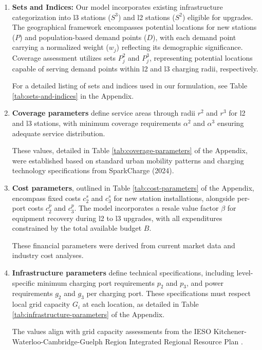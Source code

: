 \begin{enumerate}

    \item \textbf{Sets and Indices:} Our model incorporates existing infrastructure categorization into \gls{l3} stations ($S^3$) and \gls{l2} stations ($S^2$) eligible for upgrades. The geographical framework encompasses potential locations for new stations ($P$) and population-based demand points ($D$), with each demand point carrying a normalized weight ($w_j$) reflecting its demographic significance. Coverage assessment utilizes sets $P^2_j$ and $P^3_j$, representing potential locations capable of serving demand points within \gls{l2} and \gls{l3} charging radii, respectively. 
    
    For a detailed listing of sets and indices used in our formulation, see Table \ref{tab:sets-and-indices} in the Appendix.

    \item \textbf{Coverage parameters} define service areas through radii $r^2$ and $r^3$ for \gls{l2} and \gls{l3} stations, with minimum coverage requirements $\alpha^2$ and $\alpha^3$ ensuring adequate service distribution. 
    
    These values, detailed in Table \ref{tab:coverage-parameters} of the Appendix, were established based on standard urban mobility patterns and charging technology specifications from SparkCharge (2024). \cite{spark2024}

    \item \textbf{Cost parameters}, outlined in Table \ref{tab:cost-parameters} of the Appendix, encompass fixed costs $c_2^s$ and $c_3^s$ for new station installations, alongside per-port costs $c_2^p$ and $c_3^p$. The model incorporates a resale value factor $\beta$ for equipment recovery during \gls{l2} to \gls{l3} upgrades, with all expenditures constrained by the total available budget $B$. \cite{joyce2023}
    
    These financial parameters were derived from current market data and industry cost analyses. \cite{future2022}

    \item \textbf{Infrastructure parameters} define technical specifications, including level-specific minimum charging port requirements $p_2$ and $p_3$, and power requirements $g_2$ and $g_3$ per charging port. These specifications must respect local grid capacity $G_i$ at each location, as detailed in Table \ref{tab:infrastructure-parameters} of the Appendix. 
    
    The values align with grid capacity assessments from the IESO Kitchener-Waterloo-Cambridge-Guelph Region Integrated Regional Resource Plan \cite{ieso2021}.
\end{enumerate}

